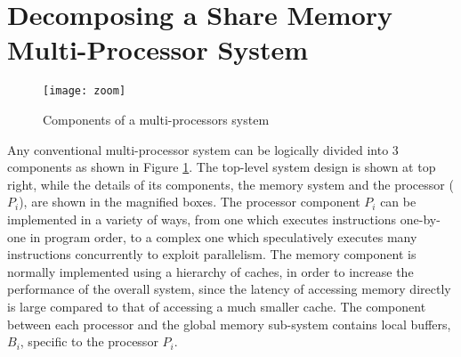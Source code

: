 %
%
%
%
\section{Decomposing a Share Memory Multi-Processor System}
\label{sec:store-atomicity}

\begin{figure}
\centering
\texttt{[image: zoom]}
\caption{Components of a multi-processors system}
\label{zoom}
\end{figure}

Any conventional multi-processor system can be logically divided into 3 components as shown in Figure \ref{zoom}. 
The top-level system design is shown at top right, while the details of its components, the memory system and the processor ($P_i$), are shown in the magnified boxes. The processor component $P_i$ can be implemented in a variety of ways, from one which executes instructions one-by-one in program order, to a complex one which speculatively executes many instructions concurrently to exploit parallelism. The memory component is normally implemented using a hierarchy of caches, in order to increase the performance of the overall system, since the latency of accessing memory directly is large compared to that of accessing a much smaller cache. The component between each processor and the global memory sub-system contains local buffers, $B_i$, specific to
the processor $P_i$. 

